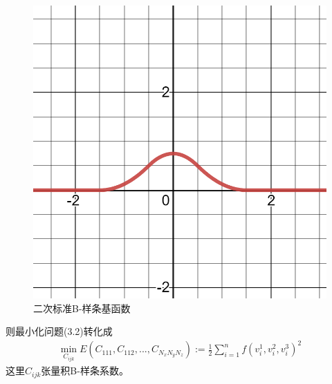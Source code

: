 \begin{figure}[htbp]
    \centering
    \includegraphics[scale=0.2]{./images/image8.png}
    \caption{二次标准B-样条基函数}
    \label{fig: standard B-spline basis}
\end{figure}
则最小化问题(3.2)转化成
\begin{equation}
    \begin{split}
        \min_{C_{ijk}}E(C_{111},C_{112},...,C_{N_xN_yN_z}):=\frac{1}{2}\sum_{i = 1}^{n} f(v_i^1,v_i^2,v_i^3)^2 
    \end{split}
\end{equation}
这里$C_{ijk}$张量积B-样条系数。

